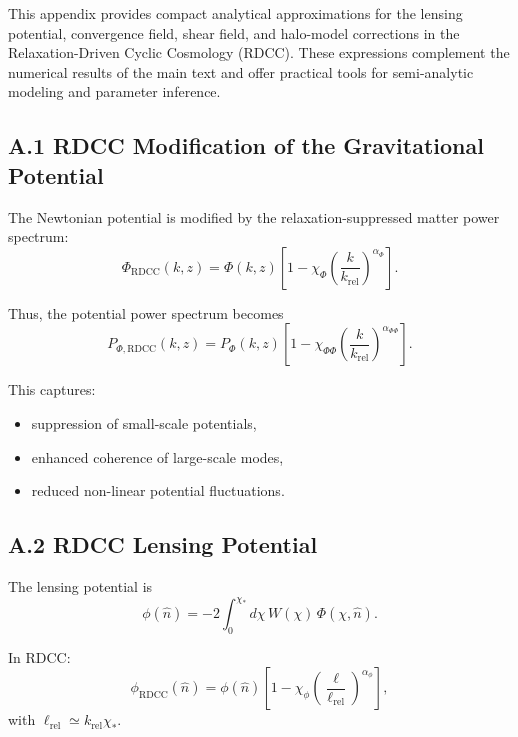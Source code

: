 \documentclass[11pt,a4paper]{article}
\begin{document}
This appendix provides compact analytical approximations for the lensing potential,
convergence field, shear field, and halo-model corrections in the Relaxation-Driven Cyclic
Cosmology (RDCC). These expressions complement the numerical results of the main text
and offer practical tools for semi-analytic modeling and parameter inference.

\subsection*{A.1 RDCC Modification of the Gravitational Potential}

The Newtonian potential is modified by the relaxation-suppressed matter power spectrum:
\begin{equation}
\Phi_{\mathrm{RDCC}}(k,z)
=
\Phi(k,z)
\left[
1
-
\chi_{\Phi}
\left(
\frac{k}{k_{\mathrm{rel}}}
\right)^{\alpha_{\Phi}}
\right].
\end{equation}

Thus, the potential power spectrum becomes
\begin{equation}
P_{\Phi,\mathrm{RDCC}}(k,z)
=
P_{\Phi}(k,z)
\left[
1
-
\chi_{\Phi\Phi}
\left(
\frac{k}{k_{\mathrm{rel}}}
\right)^{\alpha_{\Phi\Phi}}
\right].
\end{equation}

This captures:
\begin{itemize}
\item suppression of small-scale potentials,
\item enhanced coherence of large-scale modes,
\item reduced non-linear potential fluctuations.
\end{itemize}

\subsection*{A.2 RDCC Lensing Potential}

The lensing potential is
\begin{equation}
\phi(\hat{n})
=
-2
\int_{0}^{\chi_{*}}
d\chi\,
W(\chi)\,
\Phi(\chi,\hat{n}).
\end{equation}

In RDCC:
\begin{equation}
\phi_{\mathrm{RDCC}}(\hat{n})
=
\phi(\hat{n})
\left[
1
-
\chi_{\phi}
\left(
\frac{\ell}{\ell_{\mathrm{rel}}}
\right)^{\alpha_{\phi}}
\right],
\end{equation}
with $\ell_{\mathrm{rel}} \simeq k_{\mathrm{rel}}\chi_{*}$.
\end{document}
